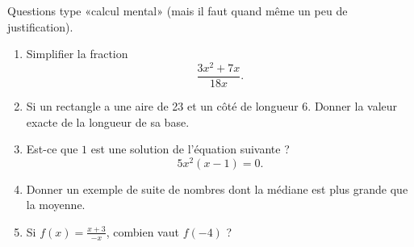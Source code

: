 
\begin{exercice}\label{exosmath-0571}

    Questions type «calcul mental» (mais il faut quand même un peu de justification).
    \begin{enumerate}
        \item
            Simplifier la fraction
            \begin{equation*}
                \frac{ 3x^2+7x }{ 18x }.
            \end{equation*}
        \item
            Si un rectangle a une aire de \unit{23}{\centi\square\meter} et un côté de longueur \unit{6}{\centi\meter}. Donner la valeur exacte de la longueur de sa base.
        \item
            Est-ce que \( 1\) est une solution de l'équation suivante ?
            \begin{equation*}
                5x^2(x-1)=0.
            \end{equation*}
        \item
            Donner un exemple de suite de nombres dont la médiane est plus grande que la moyenne.
        \item 
            Si \( f(x)=\frac{ \displaystyle x+3 }{ \displaystyle -x }\), combien vaut \( f(-4)\) ?
    \end{enumerate}

\end{exercice}
